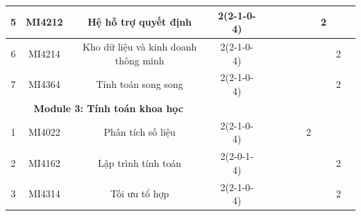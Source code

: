 \documentclass[12pt,a4paper]{report}
\begin{document}
\begin{landscape}
\begin{longtable}[c]{|c|c|c|c|c|c|c|c|c|c|c|c|}
        5                             & MI4212                          & Hệ hỗ trợ quyết định                                         & 2(2-1-0-4)                                                                           &             &             &             &             &             & 2           &             &             \\ \hline
        6                             & MI4214                          & Kho dữ liệu và kinh doanh thông minh                         & 2(2-1-0-4)                                                                           &             &             &             &             &             &             & 2           &             \\ \hline
        7                             & MI4364                          & Tính toán song song                                          & 2(2-1-0-4)                                                                           &             &             &             &             &             &             & 2           &             \\ \hline
        \multicolumn{3}{|c|}{\textbf{Module 3: Tính toán khoa học}}                                                                    &                                                                                      &             &             &             &             &             &             &             &             \\ \hline
        1                             & MI4022                          & Phân tích số liệu                                            & 2(2-1-0-4)                                                                           &             &             &             &             & 2           &             &             &             \\ \hline
        2                             & MI4162                          & Lập trình tính toán                                          & 2(2-0-1-4)                                                                           &             &             &             &             &             &             & 2           &             \\ \hline
        3                             & MI4314                          & Tối ưu tổ hợp                                                & 2(2-1-0-4)                                                                           &             &             &             &             &             &             & 2           &             \\ \hline

\end{longtable}
\end{landscape}
\end{document}
